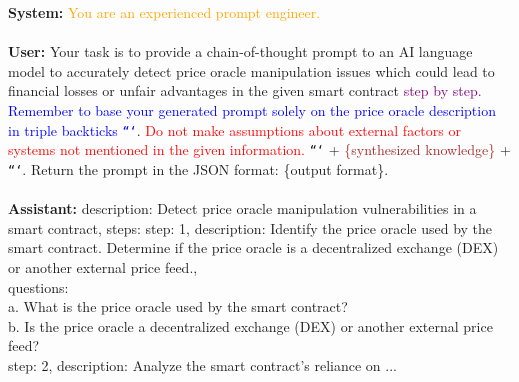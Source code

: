 \begin{tcolorbox}[float, colback=gray!20, colframe=gray!50, title={CoT Prompt Generating Example}, label=cotprompt]
\textbf{System:} \textcolor{orange}{You are an experienced prompt engineer.} \\
\\
\textbf{User:} Your task is to provide a chain-of-thought prompt to an AI language model to accurately detect price oracle manipulation issues which could lead to financial losses or unfair advantages in the given smart contract \textcolor{purple}{step by step.} \textcolor{blue}{Remember to base your generated prompt solely on the price oracle description in triple backticks \texttt{```}}. \textcolor{red}{Do not make assumptions about external factors or systems not mentioned in the given information.} \texttt{```} + \textcolor{brown}{\{synthesized knowledge\}} + \texttt{```}. Return the prompt in the JSON format: \{output format\}. \\
\\
\textbf{Assistant:} description: Detect price oracle manipulation vulnerabilities in a smart contract,  steps:
step: 1, description: Identify the price oracle used by the smart contract. Determine if the price oracle is a decentralized exchange (DEX) or another external price feed.,     \\ 
questions: \\
\hspace*{1cm} a. What is the price oracle used by the smart contract?       \\
\hspace*{1cm} b. Is the price oracle a decentralized exchange (DEX) or another external price feed? \\
    step: 2, description: Analyze the smart contract's reliance on ...
\end{tcolorbox}


